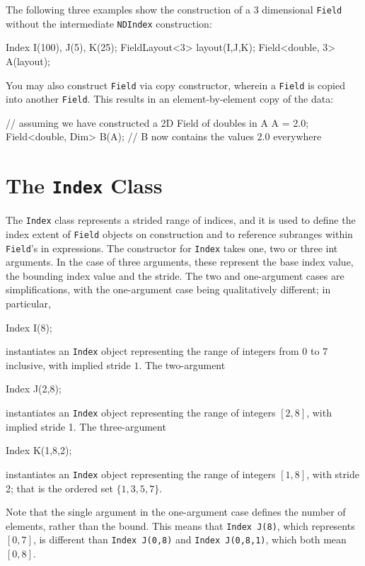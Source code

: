 The following three examples show the construction of a 3 dimensional \texttt{Field} without the intermediate \texttt{NDIndex} construction:
\begin{smallcode}
Index I(100), J(5), K(25);
FieldLayout<3> layout(I,J,K);
Field<double, 3> A(layout);
\end{smallcode}

You may also construct \texttt{Field} via copy constructor, wherein a \texttt{Field} is copied into another \texttt{Field}. This results in an element-by-element copy of the data:
\begin{smallcode}
// assuming we have constructed a 2D Field of doubles in A
A = 2.0;
Field<double, Dim> B(A);
// B now contains the values 2.0 everywhere
\end{smallcode}

\section{The \texttt{Index} Class}

The \texttt{Index} class represents a strided range of indices, and it is used to define the index extent of \texttt{Field} objects on construction and to reference subranges within \texttt{Field}'s in expressions. The constructor for \texttt{Index} takes one, two or three int arguments. In the case of three arguments, these represent the base index value, the bounding index value and the stride. The two and one-argument cases are simplifications, with the one-argument case being qualitatively different; in
particular,
\begin{smallcode}
Index I(8);
\end{smallcode}
instantiates an \texttt{Index} object representing the range of integers from $0$ to $7$ inclusive, with implied stride $1$. The two-argument
\begin{smallcode}
Index J(2,8);
\end{smallcode}
instantiates an \texttt{Index} object representing the range of integers $[2,8]$, with implied stride 1. The three-argument
\begin{smallcode}
Index K(1,8,2);
\end{smallcode}
instantiates an \texttt{Index} object representing the range of integers $[1,8]$, with stride 2; that is the ordered set $\{1,3,5,7\}$.

Note that the single argument in the one-argument case defines the number of elements, rather than the bound. This means that \texttt{Index J(8)}, which represents $[0,7]$, is different than \texttt{Index J(0,8)} and \texttt{Index J(0,8,1)}, which both mean $[0,8]$.

